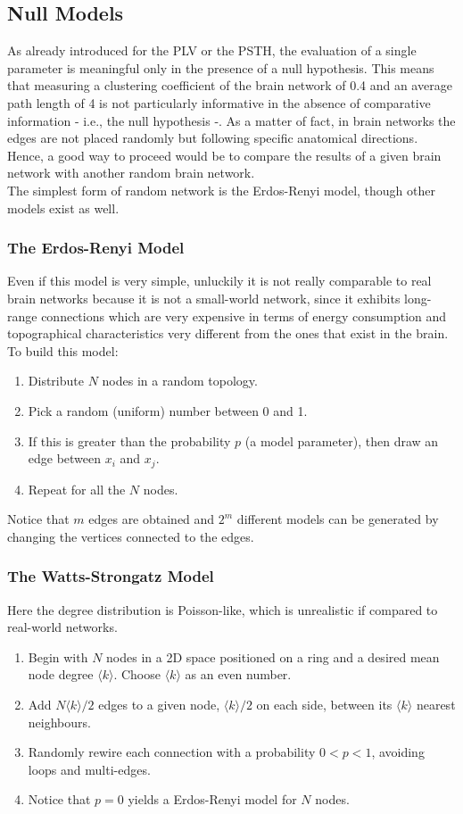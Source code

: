 \subsection{Null Models}
As already introduced for the PLV or the PSTH, the evaluation of a single parameter is meaningful only in the
presence of a null hypothesis. This means that measuring a clustering coefficient of the brain network of 0.4
and an average path length of 4 is not particularly informative in the absence of comparative information - i.e.,
the null hypothesis -.
As a matter of fact, in brain networks the edges are not placed randomly but following specific anatomical
directions. Hence, a good way to proceed would be to compare the results of a given brain network with another
random brain network.\\
The simplest form of random network is the Erdos-Renyi model, though other models exist as well.
\subsubsection{The Erdos-Renyi Model}
Even if this model is very simple, unluckily it is not really comparable to real brain networks because
it is not a small-world network, since it exhibits long-range connections which are very expensive in terms
of energy consumption and topographical characteristics very different from the ones that exist in the brain.\\
To build this model:
\begin{enumerate}
    \item Distribute \(N\) nodes in a random topology.
    \item Pick a random (uniform) number between 0 and 1.
    \item If this is greater than the probability \(p\) (a model parameter), then draw an edge between
          \(x_i\) and \(x_j\).
    \item Repeat for all the \(N\) nodes.
\end{enumerate}
Notice that \(m\) edges are obtained and \(2^m\) different models can be generated by changing the
vertices connected to the edges.
\subsubsection{The Watts-Strongatz Model}
Here the degree distribution is Poisson-like, which is unrealistic if compared to real-world networks.
\begin{enumerate}
    \item Begin with \(N\) nodes in a 2D space positioned on a ring and a desired mean node
          degree \(\langle{k}\rangle\). Choose \(\langle{k}\rangle\) as an even number.
    \item Add \(N\langle{k}\rangle/2\) edges to a given node, \(\langle{k}\rangle/2\) on each side,
          between its \(\langle{k}\rangle\) nearest neighbours.
    \item Randomly rewire each connection with a probability \(0<p<1\), avoiding loops and multi-edges.
    \item Notice that \(p=0\) yields a Erdos-Renyi model for \(N\) nodes.
\end{enumerate}
